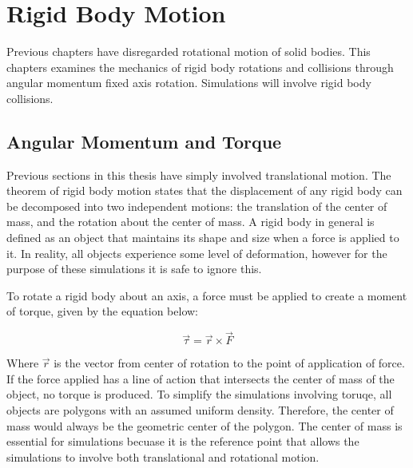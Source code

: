 
\chapter{Rigid Body Motion} %

\label{Chapter3} %



Previous chapters have disregarded rotational motion of solid bodies.  This chapters examines the mechanics of rigid body rotations and collisions through angular momentum fixed axis rotation.  Simulations will involve rigid body collisions.


\section{Angular Momentum and Torque}

Previous sections in this thesis have simply involved translational motion.  The theorem of rigid body motion states that the displacement of any rigid body can be decomposed into two independent motions: the translation of the center of mass, and the rotation about the center of mass.  A rigid body in general is defined as an object that maintains its shape and size when a force is applied to it.  In reality, all objects experience some level of deformation, however for the purpose of these simulations it is safe to ignore this.  

To rotate a rigid body about an axis, a force must be applied to create a moment of torque, given by the equation below:

\begin{equation} \label{eq:torquegeneral}
\vec{\tau} = \vec{r} \times \vec{F}
\end{equation}


Where $\vec{r}$ is the vector from center of rotation to the point of application of force.  If the force applied has a line of action that intersects the center of mass of the object, no torque is produced.  To simplify the simulations involving toruqe, all objects are polygons with an assumed uniform density.  Therefore, the center of mass would always be the geometric center of the polygon.  The center of mass is essential for simulations becuase it is the reference point that allows the simulations to involve both translational and rotational motion. 

